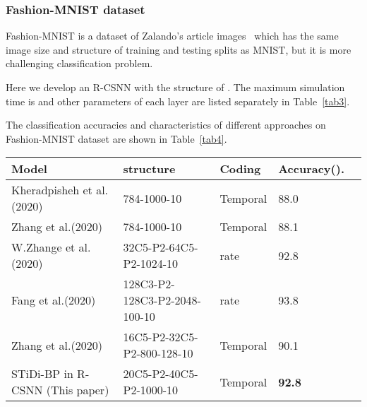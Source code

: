 \documentclass[preprint,twocolumn,5p,12pt]{article}
\begin{document}
\subsubsection{Fashion-MNIST dataset}

Fashion-MNIST is a dataset of Zalando's article images~\cite{fashion} which has the same image size and structure of training and testing splits as MNIST, but it is more challenging classification problem.

Here we develop an R-CSNN with the structure of .
The maximum simulation time is  and other parameters of each layer are listed separately in Table~\ref{tab3}.

\begin{table}
\begin{center}
\caption{Model parameters for Fashion-MNIST dataset in R-CSNN.} \label{tab3}
\end{center}
\end{table}

The classification accuracies and characteristics of different approaches on Fashion-MNIST dataset are shown in Table~\ref{tab4}.

\begin{table*}
\begin{center}
\caption{The classification accuracies of recent supervised SNNs with direct training on the fashion-MNIST dataset with input coding scheme and the network structure are provided in the table. The convolution layer and pooling layer are represented by C and P, respectively and layers are separated by -.} \label{tab4}
\begin{tabular}{llllc}
\scriptsize
Model & structure & Coding &  Accuracy(). \\
\hline
Kheradpisheh et al. (2020)~\cite{R10}& 784-1000-10 & Temporal & 88.0 \\
Zhang et al.(2020)~\cite{R18}& 784-1000-10 & Temporal & 88.1 \\
W.Zhange et al. (2020)~\cite{R11}& 32C5-P2-64C5-P2-1024-10 & rate & 92.8 \\
Fang et al.(2020)~\cite{R13}& 128C3-P2-128C3-P2-2048-100-10   & rate & 93.8 \\
Zhang et al.(2020)~\cite{R18}& 16C5-P2-32C5-P2-800-128-10 & Temporal & 90.1 \\
STiDi-BP in R-CSNN (This paper)& 20C5-P2-40C5-P2-1000-10 & Temporal & \textbf{92.8}
\end{tabular}
\end{center}
\end{table*}
\end{document}
